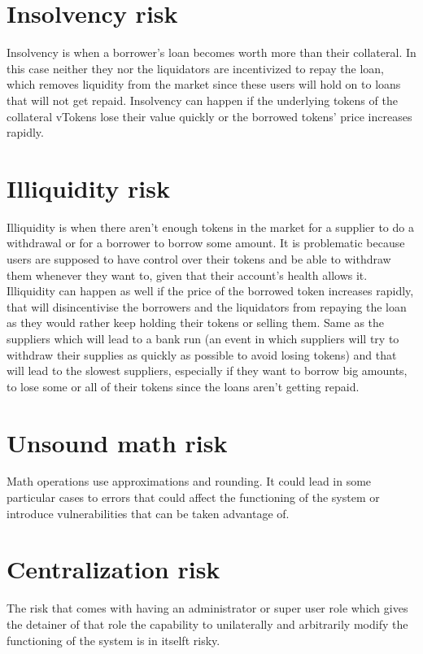 
\section{Insolvency risk} %

Insolvency is when a borrower's loan becomes worth more than their collateral. In this case neither they nor the liquidators are incentivized to repay the loan, which removes liquidity from the market since these users will hold on to loans that will not get repaid. Insolvency can happen if the underlying tokens of the collateral vTokens lose their value quickly or the borrowed tokens' price increases rapidly.

\section{Illiquidity risk} %

Illiquidity is when there aren't enough tokens in the market for a supplier to do a withdrawal or for a borrower to borrow some amount. It is problematic because users are supposed to have control over their tokens and be able to withdraw them whenever they want to, given that their account's health allows it. Illiquidity can happen as well if the price of the borrowed token increases rapidly, that will disincentivise the borrowers and the liquidators from repaying the loan as they would rather keep holding their tokens or selling them. Same as the suppliers which will lead to a bank run (an event in which suppliers will try to withdraw their supplies as quickly as possible to avoid losing tokens) and that will lead to the slowest suppliers, especially if they want to borrow big amounts, to lose some or all of their tokens since the loans aren't getting repaid.

\section{Unsound math risk}

Math operations use approximations and rounding. It could lead in some particular cases to errors that could affect the functioning of the system or introduce vulnerabilities that can be taken advantage of. %

\section{Centralization risk} %

The risk that comes with having an administrator or super user role which gives the detainer of that role the capability to unilaterally and arbitrarily modify the functioning of the system is in itselft risky. 

